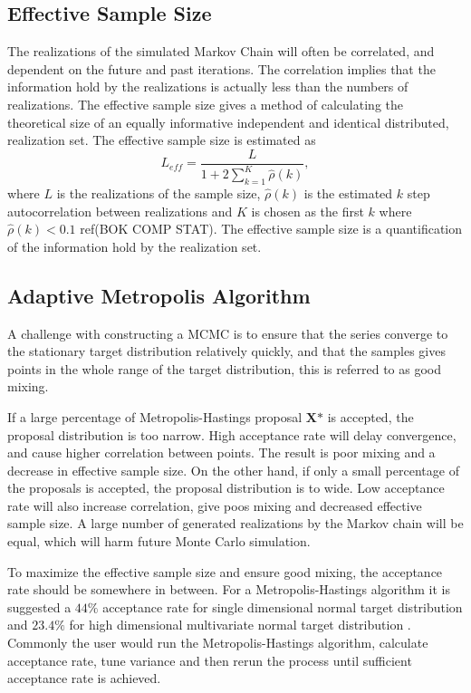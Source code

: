 \subsection{Effective Sample Size}
The realizations of the simulated Markov Chain will often be correlated, and dependent on the future and past iterations. The correlation implies that the information hold by the realizations is actually less than the numbers of realizations. The effective sample size gives a method of calculating the theoretical size of an equally informative independent and identical distributed, realization set. The effective sample size is estimated as
\begin{equation}
L_{eff}=\frac{L}{1+2\sum_{k=1}^{K}\hat{\rho}(k)},
\end{equation}
where $L$ is the realizations of the sample size, $\hat{\rho}(k)$ is the estimated $k$ step autocorrelation between realizations and $K$ is chosen as the first $k$ where $\hat{\rho}(k)<0.1$ ref(BOK COMP STAT).
\cite[p.~174]{stuart}%
The effective sample size is a quantification of the information hold by the realization set.

\subsection{Adaptive Metropolis Algorithm}
A challenge with constructing a MCMC is to ensure that the series converge to the stationary target distribution relatively quickly, and that the samples gives points in the whole range of the target distribution, this is referred to as good mixing.

If a large percentage of Metropolis-Hastings proposal $\boldsymbol{X}\mbox{*}$ is accepted, the proposal distribution is too narrow. High acceptance rate will delay convergence, and cause higher correlation between points. The result is poor mixing and a decrease in effective sample size.
On the other hand, if only a small percentage of the proposals is accepted, the proposal distribution is to wide. Low acceptance rate will also increase correlation, give poos mixing and decreased effective sample size. A large number of generated realizations by the Markov chain will be equal, which will harm future Monte Carlo simulation.

To maximize the effective sample size and ensure good mixing, the acceptance rate should be somewhere in between. For a Metropolis-Hastings algorithm it is suggested a $44\%$ acceptance rate for single dimensional normal target distribution and $23.4\%$ for high dimensional multivariate normal target distribution \cite{AccRate}. %
Commonly the user would run the Metropolis-Hastings algorithm, calculate acceptance rate, tune variance and then rerun the process until sufficient acceptance rate is achieved. 

